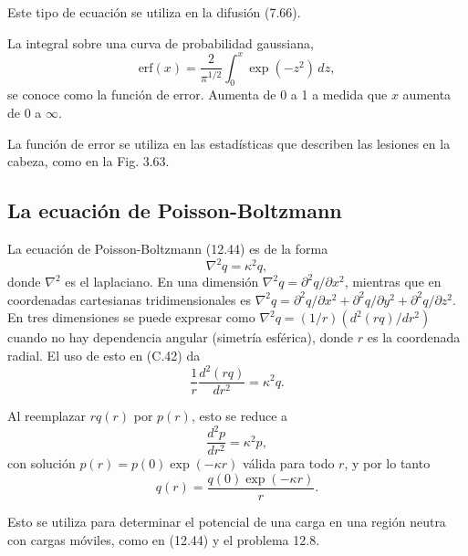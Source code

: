 \documentclass[12pt,a4paper]{book}
\begin{document}
Este tipo de ecuación se utiliza en la difusión (7.66).

La integral sobre una curva de probabilidad gaussiana,
\begin{equation}
\text{erf}(x) = \frac{2}{\pi^{1/2}} \int_{0}^{x} \exp(-z^2) \, dz,
\label{eq:C.41}
\end{equation}
se conoce como la función de error. Aumenta de 0 a 1 a medida que $x$ aumenta de 0 a $\infty$.

La función de error se utiliza en las estadísticas que describen las lesiones en la cabeza, como en la Fig. 3.63.

\subsection*{La ecuación de Poisson-Boltzmann}

La ecuación de Poisson-Boltzmann (12.44) es de la forma
\begin{equation}
\nabla^2 q = \kappa^2 q,
\label{eq:C.42}
\end{equation}
donde $\nabla^2$ es el laplaciano. En una dimensión $\nabla^2 q = \partial^2 q/\partial x^2$, mientras que en coordenadas cartesianas tridimensionales es $\nabla^2 q = \partial^2 q/\partial x^2 + \partial^2 q/\partial y^2 + \partial^2 q/\partial z^2$. En tres dimensiones se puede expresar como $\nabla^2 q = (1/r)(d^2(rq)/dr^2)$ cuando no hay dependencia angular (simetría esférica), donde $r$ es la coordenada radial. El uso de esto en (C.42) da
\begin{equation}
\frac{1}{r} \frac{d^2(rq)}{dr^2} = \kappa^2 q.
\label{eq:C.43}
\end{equation}

Al reemplazar $rq(r)$ por $p(r)$, esto se reduce a
\begin{equation}
\frac{d^2 p}{dr^2} = \kappa^2 p,
\label{eq:C.44}
\end{equation}
con solución $p(r) = p(0) \exp(-\kappa r)$ válida para todo $r$, y por lo tanto
\begin{equation}
q(r) = \frac{q(0)\exp(-\kappa r)}{r}.
\label{eq:C.45}
\end{equation}

Esto se utiliza para determinar el potencial de una carga en una región neutra con cargas móviles, como en (12.44) y el problema 12.8.


\end{document}
